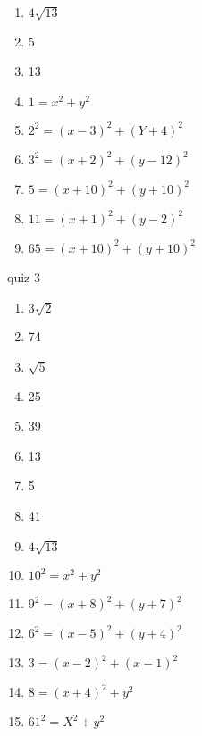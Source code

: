 \documentclass[12pt]{article}
\begin{document}
\begin{multicols}{3}
\begin{enumerate}
\item $4\sqrt{13}$

\item 5

\item 13

\item $1=x^2+y^2$

\item $2^2=(x-3)^2+(Y+4)^2$

\item $3^2=(x+2)^2+(y-12)^2$

\item $5=(x+10)^2+(y+10)^2$

\item $11=(x+1)^2+(y-2)^2$

\item $65=(x+10)^2+(y+10)^2$

\end{enumerate}

quiz 3

\begin{enumerate}

\item $3\sqrt{2}$

\item 74

\item $\sqrt{5}$

\item 25

\item 39

\item 13

\item 5

\item 41

\item $4\sqrt{13}$

\item $10^2=x^2+y^2$

\item $9^2=(x+8)^2+(y+7)^2$

\item $6^2=(x-5)^2+(y+4)^2$

\item  $3=(x-2)^2+(x-1)^2$

\item $8=(x+4)^2+y^2$

\item $61^2=X^2+y^2$

\end{enumerate}
\end{multicols}
\end{document}

